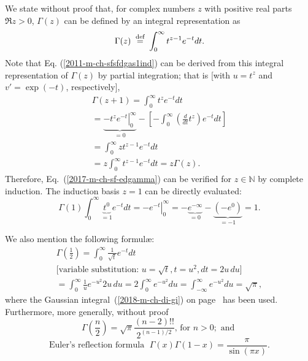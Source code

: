 We state without proof that, for complex numbers $z$
with positive real parts $\Re z >0 $,  $\Gamma (z)$ can be defined by an integral
representation as
\begin{equation}
\Gamma ( z )
\stackrel{{\tiny \textrm{ def }}}{=}
\int_0^\infty t^{z-1}e^{-t}dt
\label{2017-m-ch-sf-edgamma}
.
\end{equation}
{\color{OliveGreen}
\bproof
Note that Eq. (\ref{2011-m-ch-sfsfdgas1ind}) can be derived from this integral representation
of $\Gamma(z)$
by partial integration; that is [with $u=t^z$ and $v'=\exp (-t)$, respectively],
\begin{equation}
\begin{split}
\Gamma ( z+1 )
=
\int_0^\infty t^{z}e^{-t}dt
\\
=
\underbrace{\left. -t^{z}e^{-t}  \right|_0^\infty }_{=0}
-  \left[- \int_0^\infty \left( \frac{d }{dt}t^{z}\right) e^{-t} dt \right]
\\
=
\int_0^\infty z t^{z-1} e^{-t} dt
\\
=
z\int_0^\infty  t^{z-1} e^{-t} dt = z \Gamma ( z )
.
\end{split}
\end{equation}
Therefore, Eq.~(\ref{2017-m-ch-sf-edgamma})
can be verified for $z\in \mathbb{N}$ by complete induction. The induction basis
$z=1$  can be directly evaluated:
\begin{equation}
\Gamma ( 1 )
\int_0^\infty \underbrace{t^{0}}_{=1} e^{-t}dt = \left. - e^{-t} \right|_0^\infty
= - \underbrace{e^{-\infty}}_{=0} - \underbrace{(- e^{0})}_{=-1} =1.
\end{equation}
\eproof
}

We also mention the following formul\ae:
\begin{equation}
\begin{split}
\Gamma \left( \frac{1}{2} \right)
=\int_0^\infty  \frac{1}{\sqrt{t}} e^{-t} dt \\
\text{[variable substitution: }
u=\sqrt{t}, t=u^2, dt=2u\,du\textrm{]}\\
=\int_0^\infty  \frac{1}{u} e^{-u^2} 2u \, du
=2\int_0^\infty   e^{-u^2} du
=\int_{-\infty}^\infty   e^{-u^2} du
=\sqrt{\pi } ,
\end{split}
\end{equation}
where the Gaussian integral~(\ref{2018-m-ch-di-gi}) on page~\pageref{2018-m-ch-di-gi}  has been used.
Furthermore, more generally, without proof
\begin{equation}
\Gamma \left( \frac{n}{2}\right)=\sqrt{\pi }\frac{( n-2)!!}{2^{(n-1)/2}} \textrm{, for }n>0; \textrm {  and }
\end{equation}
\begin{equation}
\text{Euler's reflection formula }\; \Gamma ( x)\Gamma ( 1-x) =\frac{\pi}{\sin (\pi x)} .
\end{equation}



